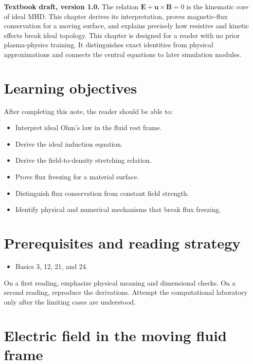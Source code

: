 \documentclass[11pt]{article}
\begin{document}

\begin{overviewbox}
\textbf{Textbook draft, version 1.0.} The relation $\mathbf E+\mathbf u\times\mathbf B=0$ is the kinematic core of ideal MHD. This chapter derives its interpretation, proves magnetic-flux conservation for a moving surface, and explains precisely how resistive and kinetic effects break ideal topology. This chapter is designed for a reader with no prior plasma-physics training. It distinguishes exact identities from physical approximations and connects the central equations to later simulation modules.
\end{overviewbox}

\ProjectTOC

\section{Learning objectives}
After completing this note, the reader should be able to:
\begin{itemize}[leftmargin=1.6em]
\item Interpret ideal Ohm's law in the fluid rest frame.
\item Derive the ideal induction equation.
\item Derive the field-to-density stretching relation.
\item Prove flux freezing for a material surface.
\item Distinguish flux conservation from constant field strength.
\item Identify physical and numerical mechanisms that break flux freezing.
\end{itemize}

\section{Prerequisites and reading strategy}
\begin{itemize}[leftmargin=1.6em]
\item Basics 3, 12, 21, and 24.
\end{itemize}
On a first reading, emphasize physical meaning and dimensional checks. On a second reading, reproduce the derivations. Attempt the computational laboratory only after the limiting cases are understood.

\section{Electric field in the moving fluid frame}
\end{document}
